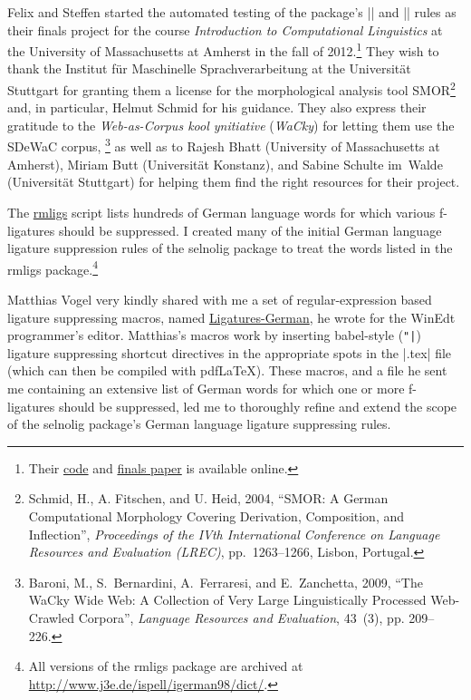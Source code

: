 \documentclass[11pt]{article}
\newcommand{\pkg}[1]{\textsf{#1}}
\begin{document}
Felix and Steffen started the automated testing of the package's |\nolig| and |\keeplig| rules as their finals project for the course \emph{Introduction to Computational Linguistics} at the University of Massachusetts at Amherst in the fall of 2012.\footnote{Their \href{https://github.com/SHildebrandt/selnolig-check}{code} and \href{https://github.com/SHildebrandt/selnolig-check/blob/master/selnolig-check-documentation.pdf?raw=true}{finals paper} is available online.} They wish to thank the Institut für Maschinelle Sprachverarbeitung at the Universität Stuttgart for granting them a license for the morphological analysis tool SMOR\footnote{Schmid, H., A. Fitschen, and U. Heid, 2004, \enquote{SMOR: A German Computational Morphology Covering Derivation, Composition, and Inflection}, \emph{Proceedings of the IVth International Conference on Language Resources and Evaluation (LREC)}, pp.~1263--1266, Lisbon, Portugal.} and, in particular, Helmut Schmid for his guidance. They also express their gratitude to the \emph{Web-as-Corpus kool ynitiative} (\emph{WaCky}) for letting them use the SDeWaC corpus,%
\footnote{Baroni, M., S.~Bernardini, A.~Ferraresi, and E.~Zanchetta, 2009, \enquote{The WaCky Wide Web: A Collection of Very Large Linguistically Processed Web-Crawled Corpora}, \emph{Language Resources and Evaluation}, 43~(3), pp. 209--226.} as well as to Rajesh Bhatt (University of Massachusetts at Amherst), Miriam Butt (Universität Konstanz), and Sabine Schulte im~Walde (Universität Stuttgart) for helping them find the right resources for their project.

The \href{http://www.ctan.org/tex-archive/support/rmligs}{\pkg{rmligs}} script lists hundreds of German language words for which various f\nobreak-liga\-tures should be suppressed. I created many of the initial German language ligature suppression rules of the \pkg{selnolig} package to treat the words listed in the \pkg{rmligs} package.\footnote{All versions of the \pkg{rmligs} package are archived at \url{http://www.j3e.de/ispell/igerman98/dict/}.} 

Matthias Vogel very kindly shared with me a set of regular-expression based ligature suppressing macros, named \href{http://www.winedt.org/Macros/LaTeX/Ligatures-German.php}{Ligatures-German}, he wrote for the WinEdt programmer's editor. Matthias's macros work by inserting \pkg{babel}-style (\Verb+"|+) ligature suppressing shortcut directives in the appropriate spots in the |.tex| file (which can then be compiled with pdf\LaTeX). These macros, and a file he sent me containing an extensive list of German words for which one or more f-ligatures should be suppressed, led me to thoroughly refine and extend the scope of the \pkg{selnolig} package's German language ligature suppressing rules.
\end{document}

